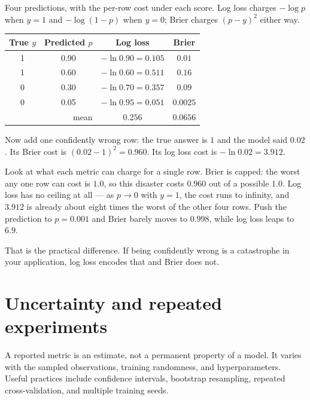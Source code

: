 \begin{workedexample}
Four predictions, with the per-row cost under each score. Log loss charges $-\log p$ when $y=1$ and $-\log(1-p)$ when $y=0$; Brier charges ${(p-y)}^2$ either way.

\begin{mltable}\small
\begin{tabular}{cccc}
\toprule
\rowcolor{MLPaleBlue!92}
True $y$ & Predicted $p$ & Log loss & Brier \\
\midrule
1 & 0.90 & $-\ln 0.90 = 0.105$ & $0.01$ \\
1 & 0.60 & $-\ln 0.60 = 0.511$ & $0.16$ \\
0 & 0.30 & $-\ln 0.70 = 0.357$ & $0.09$ \\
0 & 0.05 & $-\ln 0.95 = 0.051$ & $0.0025$ \\
\midrule
\multicolumn{2}{r}{mean} & $0.256$ & $0.0656$ \\
\bottomrule
\end{tabular}
\end{mltable}

Now add one confidently wrong row: the true answer is $1$ and the model said $0.02$. Its Brier cost is ${(0.02-1)}^2=0.960$. Its log loss cost is $-\ln 0.02 = 3.912$.

Look at what each metric can charge for a single row. Brier is capped: the worst any one row can cost is $1.0$, so this disaster costs $0.960$ out of a possible $1.0$. Log loss has no ceiling at all --- as $p\to 0$ with $y=1$, the cost runs to infinity, and $3.912$ is already about eight times the worst of the other four rows. Push the prediction to $p=0.001$ and Brier barely moves to $0.998$, while log loss leaps to $6.9$.

That is the practical difference. If being confidently wrong is a catastrophe in your application, log loss encodes that and Brier does not.
\end{workedexample}

\section{Uncertainty and repeated experiments}

A reported metric is an estimate, not a permanent property of a model. It varies with the sampled observations, training randomness, and hyperparameters. Useful practices include confidence intervals, bootstrap resampling, repeated cross-validation, and multiple training seeds.

